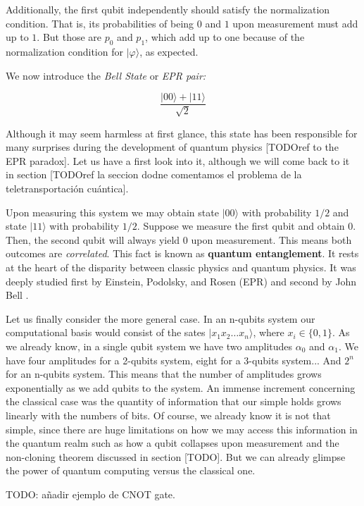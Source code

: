 Additionally, the first qubit independently should satisfy the normalization condition. That is, its probabilities of being $0$ and $1$ upon measurement must add up to $1$. But those are $p_0$ and $p_1$, which add up to one because of the normalization condition for $|\varphi\rangle$, as expected.

We now introduce the \emph{Bell State} or \emph{EPR pair:}

$$ \frac{ |00\rangle + |11\rangle }{ \sqrt 2 } $$

Although it may seem harmless at first glance, this state has been responsible for many surprises during the development of quantum physics [TODOref to the EPR paradox]. Let us have a first look into it, although we will come back to it in section [TODOref la seccion dodne comentamos el problema de la teletransportación cuántica].

Upon measuring this system we may obtain state $|00\rangle$ with probability $1/2$ and state $|11\rangle$ with probability $1/2$. Suppose we measure the first qubit and obtain $0$. Then, the second qubit will always yield $0$ upon measurement. This means both outcomes are \emph{correlated}. This fact is known as \textbf{quantum entanglement}. It rests at the heart of the disparity between classic physics and quantum physics. It was deeply studied first by Einstein, Podolsky, and Rosen (EPR) \cite{Einstein1935} and second by John Bell \cite{Bellt1964}.

Let us finally consider the more general case. In an n-qubits system our computational basis would consist of the sates $|x_1 x_2 \dotsc x_n\rangle$, where $x_i \in \{0,1\}$. As we already know, in a single qubit system we have two amplitudes $\alpha_0$ and $\alpha_1$. We have four amplitudes for a 2-qubits system, eight for a 3-qubits system... And $2^n$ for an n-qubits system. This means that the number of amplitudes grows exponentially as we add qubits to the system. An immense increment concerning the classical case was the quantity of information that our simple holds grows linearly with the numbers of bits. Of course, we already know it is not that simple, since there are huge limitations on how we may access this information in the quantum realm such as how a qubit collapses upon measurement and the non-cloning theorem discussed in section [TODO]. But we can already glimpse the power of quantum computing versus the classical one.


TODO: añadir ejemplo de CNOT gate.

